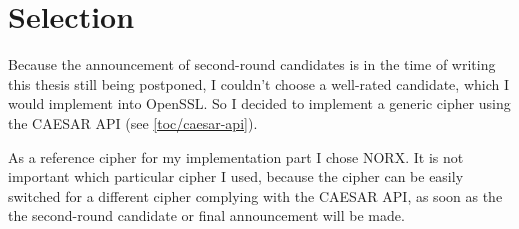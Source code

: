 \section{Selection}
\label{toc/caesar-selection}

Because the announcement of second-round candidates is in the time of writing this thesis still being postponed, I couldn't choose a well-rated candidate, which I would implement into OpenSSL. So I decided to implement a generic cipher using the CAESAR API (see \autoref{toc/caesar-api}).

As a reference cipher for my implementation part I chose NORX. It is not important which particular cipher I used, because the cipher can be easily switched for a different cipher complying with the CAESAR API, as soon as the the second-round candidate or final announcement will be made.
